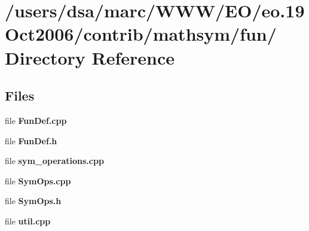 \section{/users/dsa/marc/WWW/EO/eo.19Oct2006/contrib/mathsym/fun/ Directory Reference}
\label{dir_000022}
\subsection*{Files}
\begin{CompactItemize}
\item 
file {\bf FunDef.cpp}
\item 
file {\bf FunDef.h}
\item 
file {\bf sym_operations.cpp}
\item 
file {\bf SymOps.cpp}
\item 
file {\bf SymOps.h}
\item 
file {\bf util.cpp}
\end{CompactItemize}
